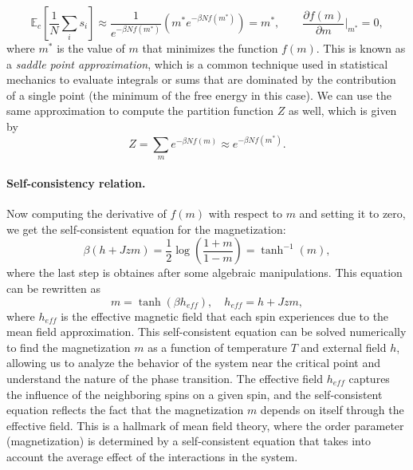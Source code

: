 \[
    \mathbb{E}_c \left[ \frac{1}{N} \sum_{i} s_i \right] \approx \frac{1}{e^{-\beta N f(m^*)}} \left( m^* e^{-\beta N f(m^*)} \right) = m^*, \qquad \frac{\partial f(m)}{\partial m}\bigg|_{m^*} = 0,
\]
where \(m^*\) is the value of \(m\) that minimizes the function \(f(m)\). This is known as a \textit{saddle point approximation}, which is a common technique used in statistical mechanics to evaluate integrals or sums that are dominated by the contribution of a single point (the minimum of the free energy in this case). We can use the same approximation to compute the partition function \(Z\) as well, which is given by
\[
    Z = \sum_{m} e^{-\beta N f(m)} \approx e^{-\beta N f(m^*)}.
\]

\paragraph{Self-consistency relation.}
Now computing the derivative of \(f(m)\) with respect to \(m\) and setting it to zero, we get the self-consistent equation for the magnetization:
\[
    \beta(h + J z m) = \frac{1}{2} \log\left( \frac{1+m}{1-m} \right) = \tanh^{-1}(m),
\]
where the last step is obtaines after some algebraic manipulations. This equation can be rewritten as
\[
    m = \tanh\left( \beta h_{eff} \right), \quad h_{eff} = h + J z m,
\]
where \(h_{eff}\) is the effective magnetic field that each spin experiences due to the mean field approximation. This self-consistent equation can be solved numerically to find the magnetization \(m\) as a function of temperature \(T\) and external field \(h\), allowing us to analyze the behavior of the system near the critical point and understand the nature of the phase transition. The effective field \(h_{eff}\) captures the influence of the neighboring spins on a given spin, and the self-consistent equation reflects the fact that the magnetization \(m\) depends on itself through the effective field. This is a hallmark of mean field theory, where the order parameter (magnetization) is determined by a self-consistent equation that takes into account the average effect of the interactions in the system.

